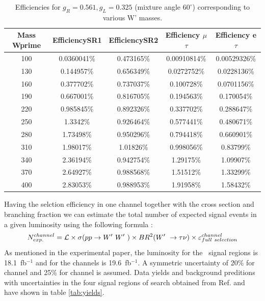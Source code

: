  \begin{table}[htb]
 	\centering
  	\begin{tabular}{|ccccc|}
  		\hline 
  		Mass Wprime & EfficiencySR1 & EfficiencySR2 & Efficiency $\mu$$\tau$ & Efficiency e $\tau$ \\
\hline 
  		100&0.0360041\%&0.473165\%&0.00910814\%&0.00529326\%\\
        	130& 0.144957\%& 0.656349\%&0.0272752\%& 0.0228136\%\\
        	160&0.377702\%&0.737037\%&0.100728\%&0.0701156\%\\
          	190& 0.667001\%& 0.816705\%& 0.194563\%& 0.170054\%\\
                220&0.985845\%&0.892326\%&0.337702\%&0.288647\%\\
                250&1.3342\%&0.926464\%&0.577441\%&0.480671\%\\ 
          	280& 1.73498\%& 0.950296\%& 0.794418\%& 0.660901\%\\
                310&1.98017\%&1.01826\%&0.998056\%&0.83799\%\\
                340& 2.36194\%& 0.942754\%& 1.29175\%& 1.09907\%\\ 
                370& 2.64927\%& 0.988568\%& 1.51512\%& 1.33299\%\\
        	400&2.83053\%&0.988953\%&1.91958\%&1.58432\%\\

  		\hline
  	\end{tabular}
  	\caption{Efficiencies for  $ g_R=0.561 , g_L=0.325$  (mixture angle $60^\circ$) corresponding to various W' masses. \label{eff-mix60} }
  \end{table}


 
Having the selction efficiency in one channel together with the cross section and branching fraction we can estimate the total number of expected signal events in a given luminosity using the following formula :
\begin{equation}
N^{channel}_{exp.}= \mathcal{L} \times \sigma(pp \to W^\prime~W^\prime~) \times BR^{2}(W^\prime~ \to \tau \nu) \times \varepsilon^{channel}_{full~selection}
\end{equation}
As mentioned in the experimental paper, the luminosity for the \tauTau ~signal regions is 18.1~fb$^{-1}$ and for the \lepTau channels is 19.6~fb$^{-1}$. A symmetric uncertainty of 20\% for \lepTau channel and 25\% for \tauTau channel is assumed. Data yields and background preditions with uncertainties in the four signal regions of search obtained from Ref.\cite{Khachatryan:2016trj} and have shown in table \ref{tab:yields}. 

